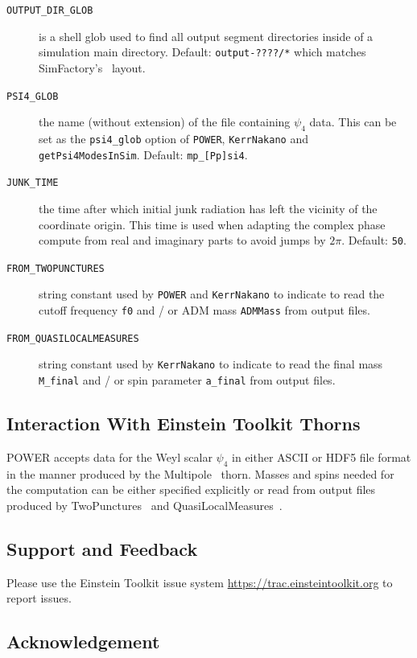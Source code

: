 \begin{description}
\item[\texttt{OUTPUT\_DIR\_GLOB}] is a shell glob used to find all output
segment directories inside of a simulation main directory. Default:
\texttt{output-????/*} which matches SimFactory's~\cite{POWER-SimFactory:web}
layout.
\item[\texttt{PSI4\_GLOB}] the name (without extension) of the file containing
$\psi_4$ data. This can be set as the \texttt{psi4\_glob} option of \texttt{POWER},
\texttt{KerrNakano} and \texttt{getPsi4ModesInSim}. Default:
\texttt{mp\_[Pp]si4}.
\item[\texttt{JUNK\_TIME}] the time after which initial junk radiation has
left the vicinity of the coordinate origin. This time is used when adapting
the complex phase compute from real and imaginary parts to avoid jumps by
$2\pi$. Default: \texttt{50}.
\item[\texttt{FROM\_TWOPUNCTURES}] string constant used by \texttt{POWER} and
\texttt{KerrNakano} to indicate to read the cutoff frequency \texttt{f0} and /
or ADM mass \texttt{ADMMass} from output files.
\item[\texttt{FROM\_QUASILOCALMEASURES}]  string constant used by 
\texttt{KerrNakano} to indicate to read the final mass \texttt{M\_final} and /
or spin parameter \texttt{a\_final} from output files.
\end{description}

\subsection{Interaction With Einstein Toolkit Thorns}

POWER accepts data for the Weyl scalar $\psi_4$ in either ASCII or HDF5 file
format in the manner produced by the Multipole~\cite{POWER-Multipole:web}
thorn. Masses and spins needed for the computation can be either specified
explicitly or read from output files produced by
TwoPunctures~\cite{POWER-TwoPunctures:web} and
QuasiLocalMeasures~\cite{POWER-QuasiLocalMeasures:web}.

\subsection{Support and Feedback}

Please use the Einstein Toolkit issue system
\url{https://trac.einsteintoolkit.org} to report issues.

\subsection{Acknowledgement}

